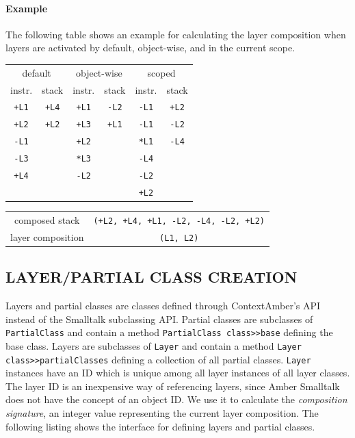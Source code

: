 \documentclass[english,paper=a4,twocolumn=true,DIV=calc,fontsize=9pt]{scrartcl}
\begin{document}
\paragraph{Example}
The following table shows an example for calculating the layer composition when layers are activated by default, object-wise, and in the current scope.
\begin{table}[h]
\centering
\begin{tabular}{cccccc}
\multicolumn{2}{c}{default} & \multicolumn{2}{c}{object-wise} & \multicolumn{2}{c}{scoped} \\
instr. & stack & instr. & stack & instr. & stack \\
\hline
\texttt{+L1} & \texttt{+L4} & \texttt{+L1} & \texttt{-L2} & \texttt{-L1} & \texttt{+L2} \\
\texttt{+L2} & \texttt{+L2} & \texttt{+L3} & \texttt{+L1} & \texttt{-L1} & \texttt{-L2} \\
\texttt{-L1} &              & \texttt{+L2} &              & \texttt{*L1} & \texttt{-L4} \\
\texttt{-L3} &              & \texttt{*L3} &              & \texttt{-L4} & \\
\texttt{+L4} &              & \texttt{-L2} &              & \texttt{-L2} & \\
             &              &              &              & \texttt{+L2} & \\
\end{tabular}
\begin{tabular}{cc}
composed stack & \texttt{(+L2, +L4, +L1, -L2, -L4, -L2, +L2)} \\
layer composition & \texttt{(L1, L2)} \\
\end{tabular}
\end{table}

\subsection{LAYER/PARTIAL CLASS CREATION}
Layers and partial classes are classes defined through ContextAmber's API instead of the Smalltalk subclassing API. Partial classes are subclasses of \texttt{PartialClass} and contain a method \texttt{PartialClass class>>base} defining the base class. Layers are subclasses of \texttt{Layer} and contain a method \texttt{Layer class>>partialClasses} defining a collection of all partial classes. \texttt{Layer} instances have an ID which is unique among all layer instances of all layer classes. The layer ID is an inexpensive way of referencing layers, since Amber Smalltalk does not have the concept of an object ID. We use it to calculate the \emph{composition signature}, an integer value representing the current layer composition. The following listing shows the interface for defining layers and partial classes.
\end{document}
